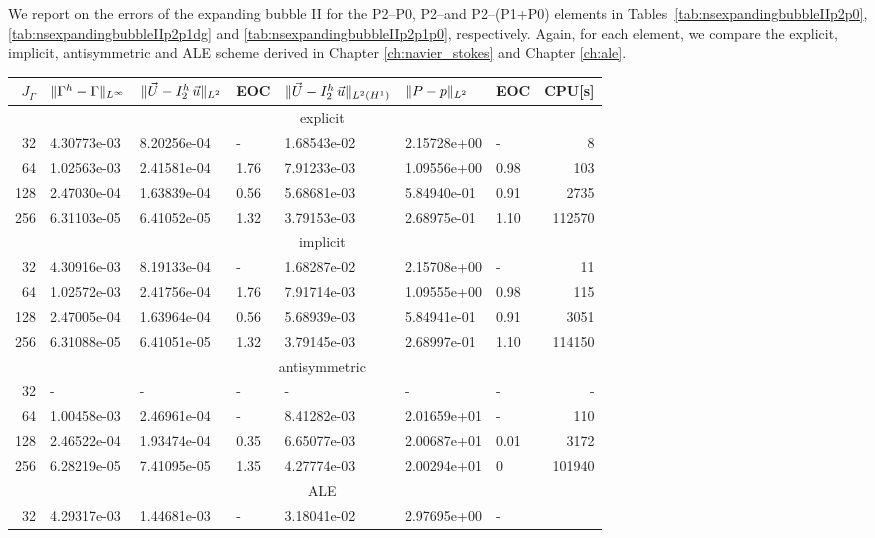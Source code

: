 We report on the errors of the expanding bubble II for the P2--P0, P2--\pdg and
P2--(P1+P0) elements in Tables~\ref{tab:nsexpandingbubbleIIp2p0},
\ref{tab:nsexpandingbubbleIIp2p1dg} and \ref{tab:nsexpandingbubbleIIp2p1p0},
respectively. Again, for each element, we compare the explicit, implicit,
antisymmetric and ALE scheme derived in Chapter \ref{ch:navier_stokes} and
Chapter \ref{ch:ale}.
\begin{table}
\center
\hspace*{-3.25cm}
\begin{tabular}{rllllllr}
\hline
$J_\Gamma$ & $\|\Gamma^h - \Gamma\|_{L^\infty}$ & $\|\vec U - I^h_{2}\,\vec u\|_{L^2}$ & EOC & $\|\vec U - I^h_{2}\,\vec u\|_{L^2(H^1)}$ & $\|P - p\|_{L^2}$ & EOC
& CPU[s] \\
\hline
& \multicolumn{7}{c}{explicit} \\
\hline
 32 & 4.30773e-03 & 8.20256e-04 &    - & 1.68543e-02 & 2.15728e+00 &    - &
8 \\
 64 & 1.02563e-03 & 2.41581e-04 & 1.76 & 7.91233e-03 & 1.09556e+00 & 0.98 &
103 \\
128 & 2.47030e-04 & 1.63839e-04 & 0.56 & 5.68681e-03 & 5.84940e-01 & 0.91 &
2735 \\
256 & 6.31103e-05 & 6.41052e-05 & 1.32 & 3.79153e-03 & 2.68975e-01 & 1.10 &
112570 \\
\hline
& \multicolumn{7}{c}{implicit} \\
\hline
 32 & 4.30916e-03 & 8.19133e-04 &    - & 1.68287e-02 & 2.15708e+00 &    - &
11 \\
 64 & 1.02572e-03 & 2.41756e-04 & 1.76 & 7.91714e-03 & 1.09555e+00 & 0.98 &
115 \\
128 & 2.47005e-04 & 1.63964e-04 & 0.56 & 5.68939e-03 & 5.84941e-01 & 0.91 &
3051 \\
256 & 6.31088e-05 & 6.41051e-05 & 1.32 & 3.79145e-03 & 2.68997e-01 & 1.10 &
114150 \\
\hline
& \multicolumn{7}{c}{antisymmetric} \\
\hline
 32 &           - &           - &    - &           - &           - &    - &
- \\
 64 & 1.00458e-03 & 2.46961e-04 &    - & 8.41282e-03 & 2.01659e+01 &    - &
110 \\
128 & 2.46522e-04 & 1.93474e-04 & 0.35 & 6.65077e-03 & 2.00687e+01 & 0.01 &
3172 \\
256 & 6.28219e-05 & 7.41095e-05 & 1.35 & 4.27774e-03 & 2.00294e+01 &    0 &
101940 \\
\hline
& \multicolumn{7}{c}{ALE} \\
\hline
 32 & 4.29317e-03 & 1.44681e-03 &    - & 3.18041e-02 & 2.97695e+00 &    - &

\end{tabular}
\end{table}
